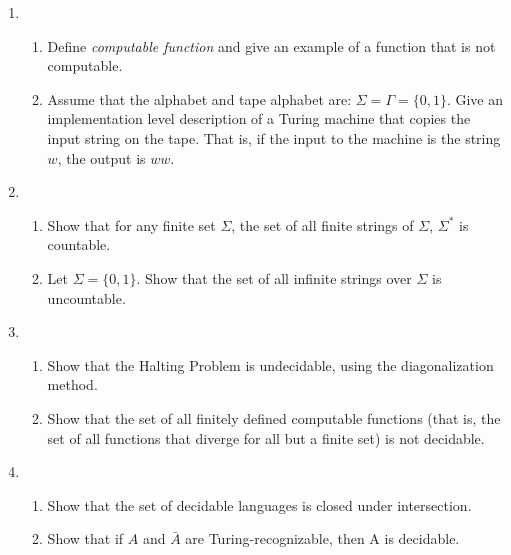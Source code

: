 \documentclass[11pt]{article}
\begin{document}
\begin{enumerate}
\item
\begin{enumerate}
	\item Define {\em computable function} and give an example of a function that is not computable.
	\item Assume that the alphabet and tape alphabet are:  $\Sigma = \Gamma = \{0,1\}$.
		Give an implementation level description of a Turing machine that
		copies the input string on the tape.  That is, if the input to the machine
		is the string $w$, the output is $ww$.

\end{enumerate}

\item 
\begin{enumerate}
	\item Show that for any finite set $\Sigma$, the set of all finite strings of $\Sigma$, 
		$\Sigma^*$ is countable.
	\item Let $\Sigma = \{0,1\}$.  Show that the set of all infinite strings over $\Sigma$ is 		uncountable.

\end{enumerate}
\item 
\begin{enumerate}
	\item Show that the Halting Problem is undecidable, using the diagonalization method.
	\item Show that the set of all finitely defined computable functions (that is, the set of 
		all functions that diverge for all but a finite set) is not decidable.
\end{enumerate}
\item
\begin{enumerate}
	\item Show that the set of decidable languages is closed under intersection.
	\item Show that if $A$ and $\bar{A}$ are Turing-recognizable, then A is decidable.


\end{enumerate}
\end{enumerate}
\end{document}
